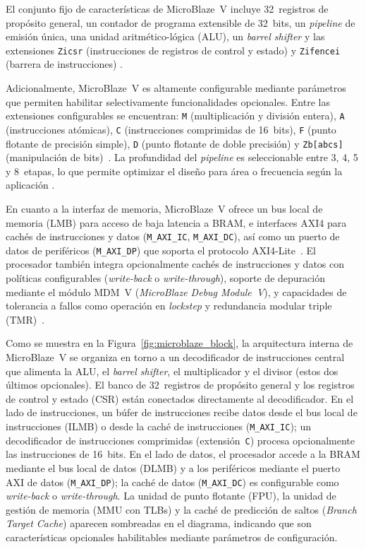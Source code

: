 El conjunto fijo de características de MicroBlaze~V incluye 32~registros de
propósito general, un contador de programa extensible de 32~bits, un
\textit{pipeline} de emisión única, una unidad aritmético-lógica (ALU), un
\textit{barrel shifter} y las extensiones \texttt{Zicsr} (instrucciones de
registros de control y estado) y \texttt{Zifencei} (barrera de instrucciones)
\cite{ug1629}.

Adicionalmente, MicroBlaze~V es altamente configurable mediante parámetros
que permiten habilitar selectivamente funcionalidades opcionales. Entre las
extensiones configurables se encuentran: \texttt{M} (multiplicación y
división entera), \texttt{A} (instrucciones atómicas), \texttt{C}
(instrucciones comprimidas de 16~bits), \texttt{F} (punto flotante de
precisión simple), \texttt{D} (punto flotante de doble precisión) y
\texttt{Zb[abcs]} (manipulación de bits)~\cite{ug1629}. La profundidad del
\textit{pipeline} es seleccionable entre 3, 4, 5 y 8~etapas, lo que permite
optimizar el diseño para área o frecuencia según la aplicación
\cite{ug1629}.

En cuanto a la interfaz de memoria, MicroBlaze~V ofrece un bus local de
memoria (LMB) para acceso de baja latencia a BRAM, e interfaces AXI4 para
cachés de instrucciones y datos (\texttt{M\_AXI\_IC}, \texttt{M\_AXI\_DC}),
así como un puerto de datos de periféricos (\texttt{M\_AXI\_DP}) que soporta
el protocolo AXI4-Lite~\cite{ug1629, ug1711}. El procesador también integra
opcionalmente cachés de instrucciones y datos con políticas configurables
(\textit{write-back} o \textit{write-through}), soporte de depuración
mediante el módulo MDM~V (\textit{MicroBlaze Debug Module~V}), y capacidades
de tolerancia a fallos como operación en \textit{lockstep} y redundancia
modular triple (TMR)~\cite{ug1629}.

Como se muestra en la Figura~\ref{fig:microblaze_block}, la arquitectura
interna de MicroBlaze~V se organiza en torno a un decodificador de
instrucciones central que alimenta la ALU, el \textit{barrel shifter}, el
multiplicador y el divisor (estos dos últimos opcionales). El banco de
32~registros de propósito general y los registros de control y estado (CSR)
están conectados directamente al decodificador. En el lado de instrucciones,
un búfer de instrucciones recibe datos desde el bus local de instrucciones
(ILMB) o desde la caché de instrucciones (\texttt{M\_AXI\_IC}); un
decodificador de instrucciones comprimidas (extensión~\texttt{C}) procesa
opcionalmente las instrucciones de 16~bits. En el lado de datos, el
procesador accede a la BRAM mediante el bus local de datos (DLMB) y a los
periféricos mediante el puerto AXI de datos (\texttt{M\_AXI\_DP}); la caché
de datos (\texttt{M\_AXI\_DC}) es configurable como \textit{write-back} o
\textit{write-through}. La unidad de punto flotante (FPU), la unidad de
gestión de memoria (MMU con TLBs) y la caché de predicción de saltos
(\textit{Branch Target Cache}) aparecen sombreadas en el diagrama, indicando
que son características opcionales habilitables mediante parámetros de
configuración.

